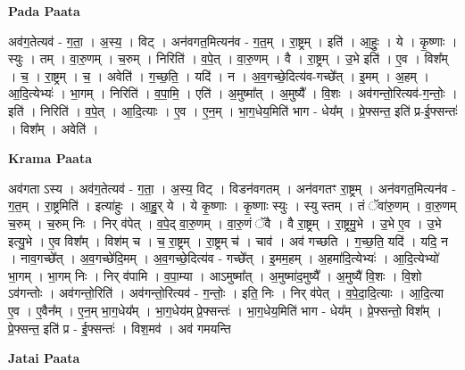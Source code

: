 \documentclass[17pt]{extarticle}
\begin{document}
\textbf{Pada Paata} \newline

अव॑ग॒तेत्यव॑ - ग॒ता॒ । अ॒स्य॒ । विट् । अन॑वगत॒मित्यन॑व - ग॒त॒म् । रा॒ष्ट्रम् । इति॑ । आ॒हुः॒ । ये । कृ॒ष्णाः । स्युः । तम् । वा॒रु॒णम् । च॒रुम् । निरिति॑ । व॒पे॒त् । वा॒रु॒णम् । वै । रा॒ष्ट्रम् । उ॒भे इति॑ । ए॒व । विश᳚म् । च॒ । रा॒ष्ट्रम् । च॒ । अवेति॑ । ग॒च्छ॒ति॒ । यदि॑ । न । अ॒व॒गच्छे॒दित्य॑व-गच्छे᳚त् । इ॒मम् । अ॒हम् । आ॒दि॒त्येभ्यः॑ । भा॒गम् । निरिति॑ । व॒पा॒मि॒ । एति॑ । अ॒मुष्मा᳚त् । अ॒मुष्यै᳚ । वि॒शः । अव॑गन्तो॒रित्यव॑-ग॒न्तोः॒ । इति॑ । निरिति॑ । व॒पे॒त् । आ॒दि॒त्याः । ए॒व । ए॒न॒म् । भा॒ग॒धेय॒मिति॑ भाग - धेय᳚म् । प्रे॒फ्सन्त॒ इति॑ प्र-ई॒फ्सन्तः॑ । विश᳚म् । अवेति॑ ।  \newline


\textbf{Krama Paata} \newline

अव॑गता ऽस्य । अव॑ग॒तेत्यव॑ - ग॒ता॒ । अ॒स्य॒ विट् । विडन॑वगतम् । अन॑वगतꣳ रा॒ष्ट्रम् । अन॑वगत॒मित्यन॑व - ग॒त॒म् । रा॒ष्ट्रमिति॑ । इत्या॑हुः । आ॒हु॒र् ये । ये कृ॒ष्णाः । कृ॒ष्णाः स्युः । स्यु स्तम् । तं ॅवा॑रु॒णम् । वा॒रु॒णम् च॒रुम् । च॒रुम् निः । निर् व॑पेत् । व॒पे॒द् वा॒रु॒णम् । वा॒रु॒णं ॅवै । वै रा॒ष्ट्रम् । रा॒ष्ट्रमु॒भे । उ॒भे ए॒व । उ॒भे इत्यु॒भे । ए॒व विश᳚म् । विश॑म् च । च॒ रा॒ष्ट्रम् । रा॒ष्ट्रम् च॑ । चाव॑ । अव॑ गच्छति । ग॒च्छ॒ति॒ यदि॑ । यदि॒ न । नाव॒गच्छे᳚त् । अ॒व॒गच्छे॑दि॒मम् । अ॒व॒गच्छे॒दित्य॑व - गच्छे᳚त् । इ॒मम॒हम् । अ॒हमा॑दि॒त्येभ्यः॑ । आ॒दि॒त्येभ्यो॑ भा॒गम् । भा॒गम् निः । निर् व॑पामि । व॒पा॒म्या । आऽमुष्मा᳚त् । अ॒मुष्मा॑द॒मुष्यै᳚ । अ॒मुष्यै॑ वि॒शः । वि॒शो ऽव॑गन्तोः । अव॑गन्तो॒रिति॑ । अव॑गन्तो॒रित्यव॑ - ग॒न्तोः॒ । इति॒ निः । निर् व॑पेत् । व॒पे॒दा॒दि॒त्याः । आ॒दि॒त्या ए॒व । ए॒वैन᳚म् । ए॒न॒म् भा॒ग॒धेय᳚म् । भा॒ग॒धेय॑म् प्रे॒फ्सन्तः॑ । भा॒ग॒धेय॒मिति॑ भाग - धेय᳚म् । प्रे॒फ्सन्तो॒ विश᳚म् । प्रे॒फ्सन्त॒ इति॑ प्र - ई॒फ्सन्तः॑ । विश॒मव॑ । अव॑ गमयन्ति \newline

\textbf{Jatai Paata} \newline
\end{document}
